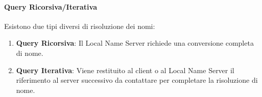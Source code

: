 \documentclass{article}
\begin{document}
\paragraph{Query Ricorsiva/Iterativa} Esistono due tipi diversi di risoluzione dei nomi:

\begin{enumerate}
    \item \textbf{Query Ricorsiva}: Il Local Name Server richiede una conversione completa di nome.
    \item \textbf{Query Iterativa}: Viene restituito al client o al Local Name Server il riferimento al server successivo da contattare per completare la risoluzione di nome.
\end{enumerate}

\vspace*{-20px}
\end{document}
